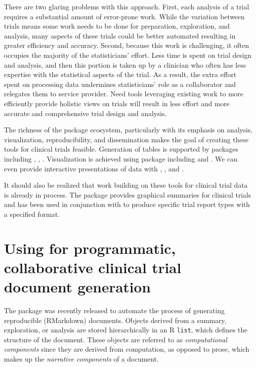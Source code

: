 There are two glaring problems with this approach. First, each analysis
of a trial requires a substantial amount of error-prone work. While the
variation between trials means some work needs to be done for
preparation, exploration, and analysis, many aspects of these trials
could be better automated resulting in greater efficiency and accuracy.
Second, because this work is challenging, it often occupies the majority
of the statisticians' effort. Less time is spent on trial design and
analysis, and then this portion is taken up by a clinician who often has
less expertise with the statistical aspects of the trial. As a result,
the extra effort spent on processing data undermines statisticians' role
as a collaborator and relegates them to service provider. Need tools
leveraging existing work to more efficiently provide holistic views on
trials will result in less effort and more accurate and comprehensive
trial design and analysis.

The richness of the \citet{R} package ecosystem, particularly with its
emphasis on analysis, visualization, reproducibility, and dissemination
makes the goal of creating these tools for clinical trials feasible.
Generation of tables is supported by packages including 
\citep{tableone},  \citep{gt}, 
\citep{gtsummary}. Visualization is achieved using package including
 \citep{ggplot2} and  \citep{survminer}. We
can even provide interactive presentations of data with 
\citep{DT},  \citep{plotly}, and 
\citep{trelliscopejs}.

It should also be realized that work building on these tools for
clinical trial data is already in process. The 
\citep{greport} package provides graphical summaries for clinical trials
and has been used in conjunction with  \citep{rmarkdown}
to produce specific trial report types with a specified format.

\hypertarget{using-for-programmatic-collaborative-clinical-trial-document-generation}{%
\section{\texorpdfstring{Using  for programmatic,
collaborative clinical trial document
generation}{Using  for programmatic, collaborative clinical trial document generation}}\label{using-for-programmatic-collaborative-clinical-trial-document-generation}}

The  package \citep{listdown} was recently released to
automate the process of generating reproducible (RMarkdown) documents.
Objects derived from a summary, exploration, or analysis are stored
hierarchically in an R \texttt{list}, which defines the structure of the
document. These objects are referred to as \emph{computational
components} since they are derived from computation, as opposed to
prose, which makes up the \emph{narrative components} of a document.

